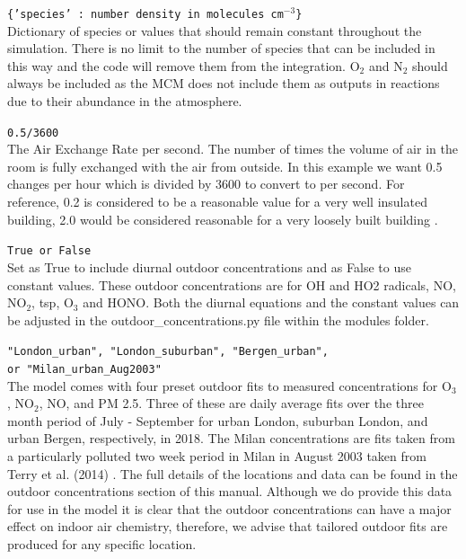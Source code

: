 \documentclass[a4paper]{refart}
\begin{document}
\texttt{\{'species' : number density in molecules cm$^{-3}$\}}\\
Dictionary of species or values that should remain constant throughout the simulation. There is no limit to the number of species that can be included in this way and the code will remove them from the integration. O$_2$ and N$_2$ should always be included as the MCM does not include them as outputs in reactions due to their abundance in the atmosphere.

\label{AER}
\texttt{0.5/3600}\\
The Air Exchange Rate per second. The number of times the volume of air in the room is fully exchanged with the air from outside. In this example we want 0.5 changes per hour which is divided by 3600 to convert to per second. For reference, 0.2 is considered to be a reasonable value for a very well insulated building, 2.0 would be considered reasonable for a very loosely built building \cite{Weschler2000}.

\texttt{True or False}\\
Set as True to include diurnal outdoor concentrations and as False to use constant values. These outdoor concentrations are for OH and HO2 radicals, NO, NO$_2$, tsp, O$_3$ and HONO. Both the diurnal equations and the constant values can be adjusted in the outdoor\_concentrations.py  file within the modules folder.

\texttt{"London\_urban", "London\_suburban", "Bergen\_urban",\\ or "Milan\_urban\_Aug2003"}\\
The model comes with four preset outdoor fits to measured concentrations for O$_3$, NO$_2$, NO, and PM 2.5. Three of these are daily average fits over the three month period of July - September for urban London, suburban London, and urban Bergen, respectively, in 2018. The Milan concentrations are fits taken from a particularly polluted two week period in Milan in August 2003 taken from Terry et al. (2014) \cite{Terry2014}. The full details of the locations and data can be found in the outdoor concentrations section of this manual.  Although we do provide this data for use in the model it is clear that the outdoor concentrations can have a major effect on indoor air chemistry, therefore, we advise that tailored outdoor fits are produced for any specific location.
\end{document}
